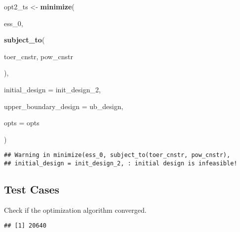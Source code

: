 \documentclass[]{book}
\newenvironment{Shaded}{\begin{snugshade}}{\end{snugshade}}
\newcommand{\DataTypeTok}[1]{\textcolor[rgb]{0.13,0.29,0.53}{#1}}
\newcommand{\DecValTok}[1]{\textcolor[rgb]{0.00,0.00,0.81}{#1}}
\newcommand{\KeywordTok}[1]{\textcolor[rgb]{0.13,0.29,0.53}{\textbf{#1}}}
\newcommand{\NormalTok}[1]{#1}
\newcommand{\OperatorTok}[1]{\textcolor[rgb]{0.81,0.36,0.00}{\textbf{#1}}}
\newcommand{\StringTok}[1]{\textcolor[rgb]{0.31,0.60,0.02}{#1}}
\begin{document}
\begin{Shaded}
\begin{Highlighting}[]
\NormalTok{opt2_ts <-}\StringTok{ }\KeywordTok{minimize}\NormalTok{(}
        
\NormalTok{        ess_}\DecValTok{0}\NormalTok{,}
        
        \KeywordTok{subject_to}\NormalTok{(}
            
\NormalTok{            toer_cnstr,}
\NormalTok{            pow_cnstr}
            
\NormalTok{        ),}
        
        \DataTypeTok{initial_design =}\NormalTok{ init_design_}\DecValTok{2}\NormalTok{,}
        
        \DataTypeTok{upper_boundary_design =}\NormalTok{ ub_design,}

        \DataTypeTok{opts =}\NormalTok{ opts}
        
\NormalTok{)}
\end{Highlighting}
\end{Shaded}

\begin{verbatim}
## Warning in minimize(ess_0, subject_to(toer_cnstr, pow_cnstr),
## initial_design = init_design_2, : initial design is infeasible!
\end{verbatim}

\hypertarget{test-cases-1}{%
\subsection{Test Cases}\label{test-cases-1}}

Check if the optimization algorithm converged.

\begin{Shaded}
\end{Shaded}

\begin{verbatim}
## [1] 20640
\end{verbatim}

\begin{Shaded}
\end{Shaded}
\end{document}
